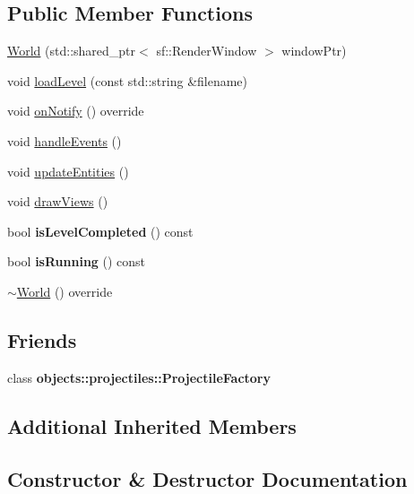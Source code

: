 \subsection*{Public Member Functions}
\begin{DoxyCompactItemize}
\item 
\hyperlink{classWorld_a96ca734b18df2cf85e666fc6d358e12c}{World} (std\+::shared\+\_\+ptr$<$ sf\+::\+Render\+Window $>$ window\+Ptr)
\item 
void \hyperlink{classWorld_a6a08c827c3a0def12b7700211353735f}{load\+Level} (const std\+::string \&filename)
\item 
void \hyperlink{classWorld_a91c2d7b127190f17a6cd85743245fb5b}{on\+Notify} () override
\item 
void \hyperlink{classWorld_ad37fe32cce284282361b9e7397b27a23}{handle\+Events} ()
\item 
void \hyperlink{classWorld_a5cc73b1aa54db5da01e4004acd4fd8bb}{update\+Entities} ()
\item 
void \hyperlink{classWorld_a8e8ad60668f8fe975f03bcb612264bc4}{draw\+Views} ()
\item 
\mbox{\label{classWorld_a89826be651c0ea4c8965403cd0b8138c}} 
bool {\bfseries is\+Level\+Completed} () const
\item 
\mbox{\label{classWorld_a6ec812e86ad7813ff1a2c92ea6d85824}} 
bool {\bfseries is\+Running} () const
\item 
\hyperlink{classWorld_adf5e8724afb4d083e566ee4e48905bf2}{$\sim$\+World} () override
\end{DoxyCompactItemize}
\subsection*{Friends}
\begin{DoxyCompactItemize}
\item 
\mbox{\label{classWorld_aae9c9276ab438e27ef024f7abcc0aae1}} 
class {\bfseries objects\+::projectiles\+::\+Projectile\+Factory}
\end{DoxyCompactItemize}
\subsection*{Additional Inherited Members}


\subsection{Constructor \& Destructor Documentation}
\mbox{\label{classWorld_a96ca734b18df2cf85e666fc6d358e12c}} 
